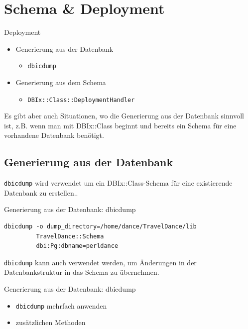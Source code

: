 
\section{Schema \& Deployment}

\begin{frame}[fragile]{Deployment}
\begin{itemize}
\item Generierung aus der Datenbank
\begin{itemize}
\item \verb|dbicdump|
\end{itemize}
\item Generierung aus dem Schema
\begin{itemize}
\item \verb|DBIx::Class::DeploymentHandler|
\end{itemize}
\end{itemize}
\end{frame}

Es gibt aber auch Situationen, wo die
Generierung aus der Datenbank sinnvoll ist,
z.B. wenn man mit DBIx::Class beginnt und
bereits ein Schema für eine vorhandene
Datenbank benötigt.


\subsection{Generierung aus der Datenbank}

\verb|dbicdump| wird verwendet um ein DBIx::Class-Schema für eine
existierende Datenbank zu erstellen..

\begin{frame}[fragile]{Generierung aus der Datenbank: dbicdump}
\begin{lstlisting}
dbicdump -o dump_directory=/home/dance/TravelDance/lib 
         TravelDance::Schema 
         dbi:Pg:dbname=perldance
\end{lstlisting}
\end{frame}

\verb|dbicdump| kann auch verwendet werden, um Änderungen in
der Datenbankstruktur in das Schema zu übernehmen.

\begin{frame}[fragile]{Generierung aus der Datenbank: dbicdump}
\begin{itemize}
\item \verb|dbicdump| mehrfach anwenden
\item zusätzlichen Methoden
\end{itemize}
\end{frame}

